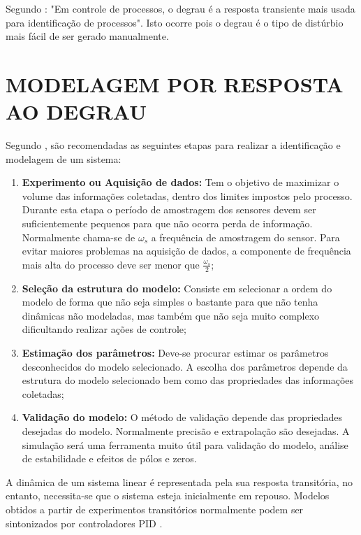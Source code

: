 \documentclass[12pt,oneside,a4paper, chapter=TITLE, section = TITLE, english, brazil]{abntex2}
\begin{document}
Segundo : "Em controle de processos, o degrau  é a resposta transiente mais usada para identificação de processos". Isto ocorre pois o degrau é o tipo de distúrbio mais fácil de ser gerado manualmente.

\section{MODELAGEM POR RESPOSTA AO DEGRAU} \label{sec:mod_degrau}

Segundo , são recomendadas as seguintes etapas para realizar a identificação e modelagem de um sistema:

\begin{enumerate}

\item \textbf{Experimento ou Aquisição de dados:} Tem o objetivo de maximizar o volume das informações coletadas, dentro dos limites impostos pelo processo. Durante esta etapa o período de amostragem dos sensores devem ser suficientemente pequenos para que não ocorra perda de informação. Normalmente chama-se de $\omega_{s}$ a frequência de amostragem do sensor. Para evitar maiores problemas na aquisição de dados, a componente de frequência mais alta do processo deve ser menor que $\frac{\omega_{s}}{2}$;

\item \textbf{Seleção da estrutura do modelo:} Consiste em selecionar a ordem do modelo de forma que não seja simples o bastante para que não tenha dinâmicas não modeladas, mas também que não seja muito complexo dificultando realizar ações de controle;

\item \textbf{Estimação dos parâmetros:} Deve-se procurar estimar os parâmetros desconhecidos do modelo selecionado. A escolha dos parâmetros depende da estrutura do modelo selecionado bem como das propriedades das informações coletadas;

\item \textbf{Validação do modelo:} O método de validação depende das propriedades desejadas do modelo. Normalmente precisão e extrapolação são desejadas. A simulação será uma ferramenta muito útil para validação do modelo, análise de estabilidade e efeitos de pólos e zeros.

\end{enumerate}

A dinâmica de um sistema linear é representada pela sua resposta transitória, no entanto, necessita-se que o sistema esteja inicialmente em repouso. Modelos obtidos a partir de experimentos transitórios normalmente podem ser sintonizados por controladores PID \cite{astrom}.
\end{document}
